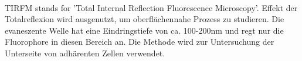 \\
TIRFM stands for 'Total Internal Reflection Fluorescence Microscopy'. Effekt der Totalreflexion wird ausgenutzt, um oberflächennahe Prozess zu studieren. Die evaneszente Welle hat eine Eindringstiefe von ca. 100-200nm und regt nur die Fluorophore in diesen Bereich an. Die Methode wird zur Untersuchung der Unterseite von adhärenten Zellen verwendet.

\newpage